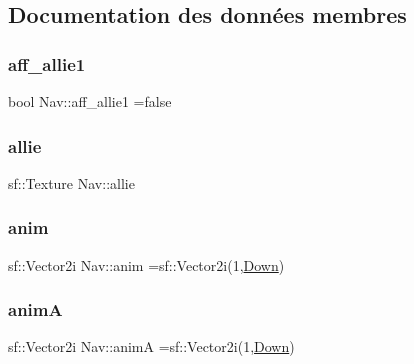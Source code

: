 \subsection{Documentation des données membres}
\mbox{\label{class_nav_a5847e7ce67da84ebd4a9c573c296130f}} 
\subsubsection{\texorpdfstring{aff\+\_\+allie1}{aff\_allie1}}
{\footnotesize\ttfamily bool Nav\+::aff\+\_\+allie1 =false}

\mbox{\label{class_nav_a055298afaad86874d561bfcebaa02c63}} 
\subsubsection{\texorpdfstring{allie}{allie}}
{\footnotesize\ttfamily sf\+::\+Texture Nav\+::allie}

\mbox{\label{class_nav_ae0e15b708bdcda1b96cac062f85aae84}} 
\subsubsection{\texorpdfstring{anim}{anim}}
{\footnotesize\ttfamily sf\+::\+Vector2i Nav\+::anim =sf\+::\+Vector2i(1,\hyperlink{class_nav_a08a9562b15243f3e42d98588db65090ea2b91c812608ee39ea6dca48340e5b213}{Down})}

\mbox{\label{class_nav_ae8ee5f25cef0d0877d9af9a5cda0284b}} 
\subsubsection{\texorpdfstring{animA}{animA}}
{\footnotesize\ttfamily sf\+::\+Vector2i Nav\+::animA =sf\+::\+Vector2i(1,\hyperlink{class_nav_a08a9562b15243f3e42d98588db65090ea2b91c812608ee39ea6dca48340e5b213}{Down})}

\mbox{\label{class_nav_a043c88faeaccbaa50b3ac62e4a5ac9e8}} 

